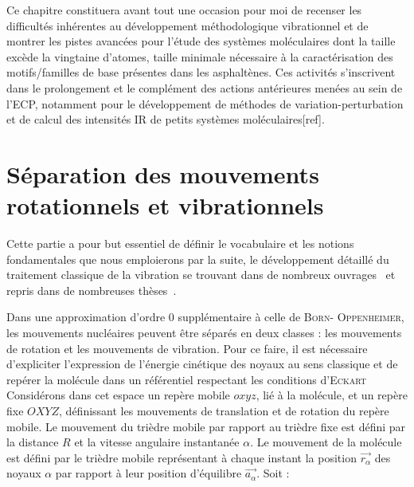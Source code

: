 Ce chapitre constituera avant tout une occasion pour moi de recenser les difficultés inhérentes au développement méthodologique vibrationnel et de montrer les pistes avancées pour l'étude des systèmes moléculaires dont la taille excède la vingtaine d'atomes, taille minimale nécessaire à la caractérisation des motifs/familles de base présentes dans les asphaltènes. Ces activités s’inscrivent dans le prolongement et le complément des actions antérieures menées au sein de l'ECP, notamment pour le développement de méthodes de variation-perturbation et de calcul des intensités IR de petits systèmes moléculaires[ref]. 



\section[Séparation des mouvements]{Séparation des mouvements rotationnels et vibrationnels}

Cette partie a pour but essentiel de définir le vocabulaire et les notions fondamentales que nous emploierons par la suite, le développement détaillé du traitement classique de la vibration se trouvant dans de nombreux ouvrages~\cite{II-4,II-9,II-12} et repris dans de nombreuses thèses~\cite{II-13,II-14}.

Dans une approximation d'ordre 0 supplémentaire à celle de \textsc{Born}- \textsc{Oppenheimer}, les mouvements nucléaires peuvent être séparés en deux classes : les mouvements de rotation et les mouvements de vibration.
Pour ce faire, il est nécessaire d'expliciter l'expression de l'énergie cinétique des noyaux au sens classique et de repérer la molécule dans un référentiel respectant les conditions d'\textsc{Eckart}~\cite{II-1}
Considérons dans cet espace un repère mobile $oxyz$, lié à la molécule, et un repère fixe $OXYZ$, définissant les mouvements de translation et de rotation du repère mobile. Le mouvement du trièdre mobile par rapport au trièdre fixe est défini par la distance $R$ et la vitesse angulaire instantanée $\alpha$.
Le mouvement de la molécule est défini par le trièdre mobile représentant à chaque instant la position $\stackrel{\rightarrow}{r_{\alpha}}$ des noyaux $\alpha$ par rapport à leur position d'équilibre $\stackrel{\rightarrow}{a_{\alpha}}$. Soit : 

